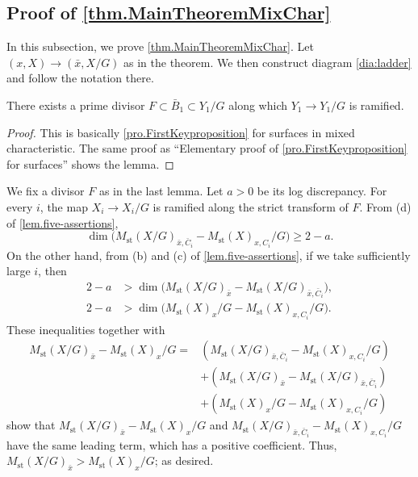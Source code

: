 \documentclass[12pt]{amsart}
\theoremstyle{plain}   %
\theoremstyle{definition}    %
\theoremstyle{remark}    %
\numberwithin{equation}{theorem}
\DeclareMathOperator{\st}{\mathrm{st}}
\begin{document}
\subsection{Proof of \autoref{thm.MainTheoremMixChar}}

In this subsection, we prove \autoref{thm.MainTheoremMixChar}. 
Let $(x,X)\to (\bar{x},X/G)$ as in the theorem. We then construct diagram \autoref{dia:ladder} and follow the notation there.

\begin{lemma}
    There exists a prime divisor $F \subset \bar{B}_1  \subset Y_1/G$ along which $Y_1\to Y_1/G$ is ramified.
\end{lemma}

\begin{proof}
 This is basically \autoref{pro.FirstKeyproposition} for surfaces in mixed characteristic. The same proof as ``Elementary proof of \autoref{pro.FirstKeyproposition} for surfaces'' shows the lemma. 
\end{proof}

We fix a divisor $F$ as in the last lemma. Let $a>0$ be its log discrepancy. For every $i$, the map $X_i \to X_i/G$ is ramified along the strict transform of $F$. 
From (d) of \autoref{lem.five-assertions}, 
\[
\dim\big(M_{\st}(X/G)_{\bar{x},\bar{C}_i} - M_{\st}(X)_{x,C_i}/G\big) \ge 
 2-a.
\]
On the other hand, 
from (b) and (c) of \autoref{lem.five-assertions}, if we take sufficiently large $i$, then 
\begin{align*}
2-a &>\dim \big(M_{\st}(X/G)_{\bar{x}}-M_{\st}(X/G)_{\bar{x},\bar{C}_i} \big),\\
2-a &>\dim \big(M_{\st}(X)_{x}/G-M_{\st}(X)_{x,C_i}/G \big).
\end{align*}
These inequalities together with 
\begin{align*}
M_{\st}(X/G)_{\bar{x}} - M_{\st}(X)_{x}/G
={}&
(M_{\st}(X/G)_{\bar{x},\bar{C}_i} - M_{\st}(X)_{x,C_i}/G) \\
&+(M_{\st}(X/G)_{\bar{x}}-M_{\st}(X/G)_{\bar{x},\bar{C}_i} ) \\
&+(M_{\st}(X)_{x}/G-M_{\st}(X)_{x,C_i}/G )
\end{align*}
show that $M_{\st}(X/G)_{\bar{x}} - M_{\st}(X)_{x}/G$ and 
$
M_{\st}(X/G)_{\bar{x},\bar{C}_i} - M_{\st}(X)_{x,C_i}/G$
have the same leading term, which has a positive coefficient. Thus, $M_{\st}(X/G)_{\bar{x}} > M_{\st}(X)_{x}/G$; as desired.



\end{document}
